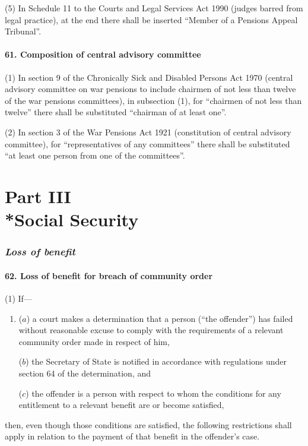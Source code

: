 \documentclass[12pt,a4paper]{article}
\begin{document}
(5) In Schedule 11 to the Courts and Legal Services Act 1990 (judges barred from legal practice), at the end there shall be inserted “Member of a Pensions Appeal Tribunal”.

\subsection{61. Composition of central advisory committee}

(1) In section 9 of the Chronically Sick and Disabled Persons Act 1970 (central advisory committee on war pensions to include chairmen of not less than twelve of the war pensions committees), in subsection (1), for “chairmen of not less than twelve” there shall be substituted “chairman of at least one”.

(2) In section 3 of the War Pensions Act 1921 (constitution of central advisory committee), for “representatives of any committees” there shall be substituted “at least one person from one of the committees”.


\part[Part III --- Social Security]{Part III\\*Social Security}

\renewcommand\parthead{--- Part III}

\section{\itshape Loss of benefit}

\subsection{62. Loss of benefit for breach of community order}

(1) If—
\begin{enumerate}\item[]
($a$) a court makes a determination that a person (“the offender”) has failed without reasonable excuse to comply with the requirements of a relevant community order made in respect of him,

($b$) the Secretary of State is notified in accordance with regulations under section 64 of the determination, and

($c$) the offender is a person with respect to whom the conditions for any entitlement to a relevant benefit are or become satisfied,
\end{enumerate}
then, even though those conditions are satisfied, the following restrictions shall apply in relation to the payment of that benefit in the offender’s case.
\end{document}
